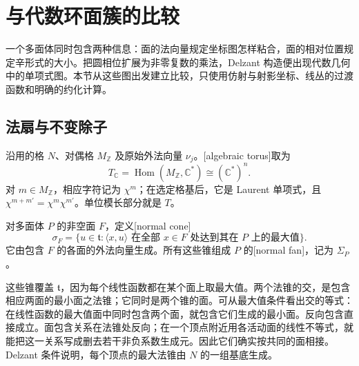 
% 
% 
% 

\section{与代数环面簇的比较}
\label{g4:sec:1205}

一个多面体同时包含两种信息：面的法向量规定坐标图怎样粘合，面的相对位置规定辛形式的大小。把圆相位扩展为非零复数的乘法，Delzant 构造便出现代数几何中的单项式图。本节从这些图出发建立比较，只使用仿射与射影坐标、线丛的过渡函数和明确的约化计算。

\subsection{法扇与不变除子}
\label{g4:subsec:1205:01}

沿用的格 \(N\)、对偶格 \(M_{\mathbb Z}\) 及原始外法向量 \(\nu_j\)。[algebraic torus]取为
\[
	T_{\mathbb C}=\operatorname{Hom}(M_{\mathbb Z},\mathbb C^*)
	\cong(\mathbb C^*)^n.
\]
对 \(m\in M_{\mathbb Z}\)，相应字符记为 \(\chi^m\)；在选定格基后，它是 Laurent 单项式，且 \(\chi^{m+m'}=\chi^m\chi^{m'}\)。单位模长部分就是 \(T\)。

\begin{definition}\label{g4:def:1205:normal-fan}
	对多面体 \(P\) 的非空面 \(F\)，定义[normal cone]
	\[
		\sigma_F=
		\{u\in\mathfrak t:\langle x,u\rangle
		\text{ 在全部 }x\in F\text{ 处达到其在 }P\text{ 上的最大值}\}.
	\]
	它由包含 \(F\) 的各面的外法向量生成。所有这些锥组成 \(P\) 的[normal fan]，记为 \(\Sigma_P\)。
\end{definition}

这些锥覆盖 \(\mathfrak t\)，因为每个线性函数都在某个面上取最大值。两个法锥的交，是包含相应两面的最小面之法锥；它同时是两个锥的面。可从最大值条件看出交的等式：在线性函数的最大值面中同时包含两个面，就包含它们生成的最小面。反向包含直接成立。面包含关系在法锥处反向；在一个顶点附近用各活动面的线性不等式，就能把这一关系写成删去若干非负系数生成元。因此它们确实按共同的面相接。Delzant 条件说明，每个顶点的最大法锥由 \(N\) 的一组基底生成。

\ProseParagraphBreak

